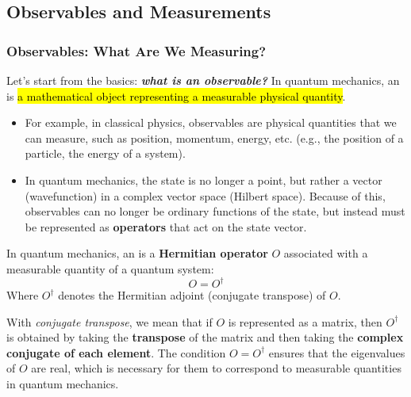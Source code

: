 \subsection{Observables and Measurements}

\subsubsection{Observables: What Are We Measuring?}\label{sec:observables-what-are-we-measuring}

Let's start from the basics: \textbf{\emph{what is an observable?}} In quantum mechanics, an  is \hl{a mathematical object representing a measurable physical quantity}.
\begin{itemize}
    \item For example, in classical physics, observables are physical quantities that we can measure, such as position, momentum, energy, etc. (e.g., the position of a particle, the energy of a system).
    \item In quantum mechanics, the state is no longer a point, but rather a vector (wavefunction) in a complex vector space (Hilbert space). Because of this, observables can no longer be ordinary functions of the state, but instead must be represented as \textbf{operators} that act on the state vector.
\end{itemize}

\begin{definitionbox}[: Observable]
    In quantum mechanics, an  is a \textbf{Hermitian operator} $O$ associated with a measurable quantity of a quantum system:
    \begin{equation*}
        O = O^{\dagger}
    \end{equation*}
    Where $O^{\dagger}$ denotes the Hermitian adjoint (conjugate transpose) of $O$.

    \highspace
    With \emph{conjugate transpose}, we mean that if $O$ is represented as a matrix, then $O^{\dagger}$ is obtained by taking the \textbf{transpose} of the matrix and then taking the \textbf{complex conjugate of each element}. The condition $O = O^{\dagger}$ ensures that the eigenvalues of $O$ are real, which is necessary for them to correspond to measurable quantities in quantum mechanics.
\end{definitionbox}

